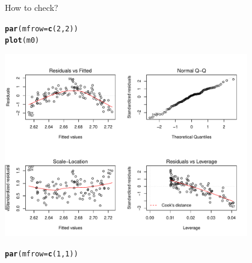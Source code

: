 \documentclass[10pt]{beamer}\usepackage[]{graphicx}\usepackage[]{color}
\makeatletter
\newcommand{\hlnum}[1]{\textcolor[rgb]{0.686,0.059,0.569}{#1}}%
\newcommand{\hlstd}[1]{\textcolor[rgb]{0.345,0.345,0.345}{#1}}%
\newcommand{\hlkwc}[1]{\textcolor[rgb]{0.333,0.667,0.333}{#1}}%
\newcommand{\hlkwd}[1]{\textcolor[rgb]{0.737,0.353,0.396}{\textbf{#1}}}%
\newenvironment{kframe}{%
 \def\at@end@of@kframe{}%
 \ifinner\ifhmode%
  \def\at@end@of@kframe{\end{minipage}}%
  \begin{minipage}{\columnwidth}%
 \fi\fi%
 \def\FrameCommand##1{\hskip\@totalleftmargin \hskip-\fboxsep
 \colorbox{shadecolor}{##1}\hskip-\fboxsep
     \hskip-\linewidth \hskip-\@totalleftmargin \hskip\columnwidth}%
 \MakeFramed {\advance\hsize-\width
   \@totalleftmargin\z@ \linewidth\hsize
   \@setminipage}}%
 {\par\unskip\endMakeFramed%
 \at@end@of@kframe}
\newenvironment{knitrout}{}{} %
\makeatother
\begin{document}
\begin{frame}[fragile]{How to check?}
\begin{knitrout}\small
{}\color{fgcolor}\begin{kframe}
\begin{alltt}
\hlkwd{par}\hlstd{(}\hlkwc{mfrow}\hlstd{=}\hlkwd{c}\hlstd{(}\hlnum{2}\hlstd{,}\hlnum{2}\hlstd{))}
  \hlkwd{plot}\hlstd{(m0)}
\end{alltt}
\end{kframe}
\includegraphics[width=0.8\textwidth,height=0.6\textwidth]{figure/unnamed-chunk-8-1} 
\begin{kframe}\begin{alltt}
\hlkwd{par}\hlstd{(}\hlkwc{mfrow}\hlstd{=}\hlkwd{c}\hlstd{(}\hlnum{1}\hlstd{,}\hlnum{1}\hlstd{))}
\end{alltt}
\end{kframe}
\end{knitrout}
\end{frame}
\end{document}
